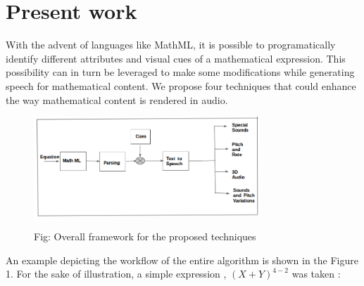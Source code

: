 \documentclass{acm_proc_article-sp}
\begin{document}
\section{Present work}
\label{sec:techniques}
With the advent of languages like MathML, it is possible to programatically identify different attributes and visual cues of a mathematical expression. This possibility can in turn be leveraged to make some modifications  while generating speech for mathematical content.  We propose four techniques that could enhance the way mathematical content is rendered in audio.
\begin{figure}[h]

\label{fig:res}



\begin{minipage}[b]{1.0\linewidth}

  \centering

  

  \centerline{\includegraphics[width=8.5cm]{block}}

 


  \centerline{Fig: Overall framework for the proposed techniques}\medskip

\end{minipage}

\end{figure}
An example depicting the workflow of the entire algorithm is shown in the Figure 1. For the sake of illustration, a simple expression , $(X+Y)^{4-2} $ was taken :
\end{document}
